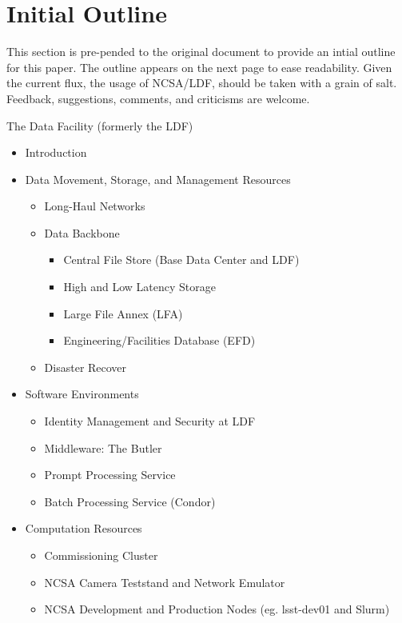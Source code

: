

\section{Initial Outline}

This section is pre-pended to the original document to provide an intial outline for this paper.
The outline appears on the next page to ease readability.  Given the current flux, the usage of NCSA/LDF,
should be taken with a grain of salt.  Feedback, suggestions, comments, and criticisms are welcome.\\
\clearpage

The Data Facility (formerly the LDF)
\begin{itemize}
    \item Introduction
    \item Data Movement, Storage, and Management Resources
    \begin{itemize}
        \item Long-Haul Networks
        \item Data Backbone
        \begin{itemize}
            \item Central File Store (Base Data Center and LDF)
            \item High and Low Latency Storage 
            \item Large File Annex (LFA)
            \item Engineering/Facilities Database (EFD)
        \end{itemize}
        \item Disaster Recover
    \end{itemize}
    \item Software Environments
    \begin{itemize}
        \item Identity Management and Security at LDF
        \item Middleware: The Butler
        \item Prompt Processing Service
        \item Batch Processing Service (Condor)
    \end{itemize}
    \item Computation Resources
    \begin{itemize}
        \item Commissioning Cluster
        \item NCSA Camera Teststand and Network Emulator
        \item NCSA Development and Production Nodes (eg. lsst-dev01 and Slurm)

\end{itemize}
\end{itemize}
